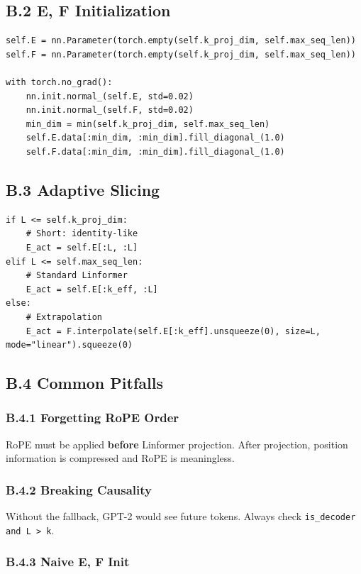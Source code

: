 \subsection{B.2 E, F Initialization}

\begin{lstlisting}
self.E = nn.Parameter(torch.empty(self.k_proj_dim, self.max_seq_len))
self.F = nn.Parameter(torch.empty(self.k_proj_dim, self.max_seq_len))

with torch.no_grad():
    nn.init.normal_(self.E, std=0.02)
    nn.init.normal_(self.F, std=0.02)
    min_dim = min(self.k_proj_dim, self.max_seq_len)
    self.E.data[:min_dim, :min_dim].fill_diagonal_(1.0)
    self.F.data[:min_dim, :min_dim].fill_diagonal_(1.0)
\end{lstlisting}

\subsection{B.3 Adaptive Slicing}

\begin{lstlisting}
if L <= self.k_proj_dim:
    # Short: identity-like
    E_act = self.E[:L, :L]
elif L <= self.max_seq_len:
    # Standard Linformer
    E_act = self.E[:k_eff, :L]
else:
    # Extrapolation
    E_act = F.interpolate(self.E[:k_eff].unsqueeze(0), size=L, mode="linear").squeeze(0)
\end{lstlisting}

\subsection{B.4 Common Pitfalls}

\subsubsection{B.4.1 Forgetting RoPE Order}

RoPE must be applied \textbf{before} Linformer projection. After projection, 
position information is compressed and RoPE is meaningless.

\subsubsection{B.4.2 Breaking Causality}

Without the fallback, GPT-2 would see future tokens. Always check 
\texttt{is\_decoder and L > k}.

\subsubsection{B.4.3 Naive E, F Init}


